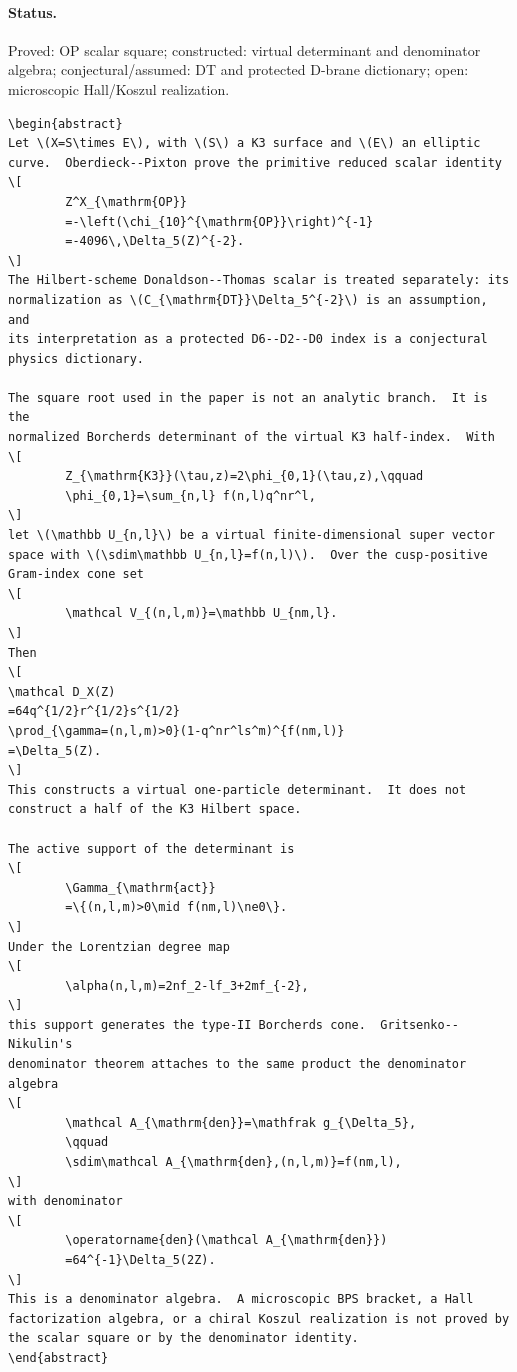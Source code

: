 \paragraph{Status.}
Proved: OP scalar square; constructed: virtual determinant and
denominator algebra; conjectural/assumed: DT and protected D-brane
dictionary; open: microscopic Hall/Koszul realization.

\begin{verbatim}
\begin{abstract}
Let \(X=S\times E\), with \(S\) a K3 surface and \(E\) an elliptic
curve.  Oberdieck--Pixton prove the primitive reduced scalar identity
\[
        Z^X_{\mathrm{OP}}
        =-\left(\chi_{10}^{\mathrm{OP}}\right)^{-1}
        =-4096\,\Delta_5(Z)^{-2}.
\]
The Hilbert-scheme Donaldson--Thomas scalar is treated separately: its
normalization as \(C_{\mathrm{DT}}\Delta_5^{-2}\) is an assumption, and
its interpretation as a protected D6--D2--D0 index is a conjectural
physics dictionary.

The square root used in the paper is not an analytic branch.  It is the
normalized Borcherds determinant of the virtual K3 half-index.  With
\[
        Z_{\mathrm{K3}}(\tau,z)=2\phi_{0,1}(\tau,z),\qquad
        \phi_{0,1}=\sum_{n,l} f(n,l)q^nr^l,
\]
let \(\mathbb U_{n,l}\) be a virtual finite-dimensional super vector
space with \(\sdim\mathbb U_{n,l}=f(n,l)\).  Over the cusp-positive
Gram-index cone set
\[
        \mathcal V_{(n,l,m)}=\mathbb U_{nm,l}.
\]
Then
\[
\mathcal D_X(Z)
=64q^{1/2}r^{1/2}s^{1/2}
\prod_{\gamma=(n,l,m)>0}(1-q^nr^ls^m)^{f(nm,l)}
=\Delta_5(Z).
\]
This constructs a virtual one-particle determinant.  It does not
construct a half of the K3 Hilbert space.

The active support of the determinant is
\[
        \Gamma_{\mathrm{act}}
        =\{(n,l,m)>0\mid f(nm,l)\ne0\}.
\]
Under the Lorentzian degree map
\[
        \alpha(n,l,m)=2nf_2-lf_3+2mf_{-2},
\]
this support generates the type-II Borcherds cone.  Gritsenko--Nikulin's
denominator theorem attaches to the same product the denominator algebra
\[
        \mathcal A_{\mathrm{den}}=\mathfrak g_{\Delta_5},
        \qquad
        \sdim\mathcal A_{\mathrm{den},(n,l,m)}=f(nm,l),
\]
with denominator
\[
        \operatorname{den}(\mathcal A_{\mathrm{den}})
        =64^{-1}\Delta_5(2Z).
\]
This is a denominator algebra.  A microscopic BPS bracket, a Hall
factorization algebra, or a chiral Koszul realization is not proved by
the scalar square or by the denominator identity.
\end{abstract}
\end{verbatim}

